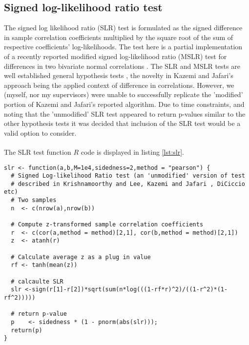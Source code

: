\subsection{Signed log-likelihood ratio test}
The signed log likelihood ratio (SLR) test is formulated as the signed difference in sample correlation coefficients multiplied by the square root of the sum of respective coefficients' log-likelihoods.  The test here is a partial implementation of a recently reported modified signed log-likelihood ratio (MSLR) test  for differences in two bivariate normal correlations \cite{Kazemi2016}. The SLR and MSLR tests are well established general hypothesis tests \cite{Barndorff1986,Barndorff1991,Diciccio2001,Krishnamoorthy2014}, the novelty in Kazemi and Jafari's approach being the applied context of difference in correlations. However, we (myself, nor my supervisors) were unable to successfully replicate the 'modified' portion of Kazemi and Jafari's reported algorithm.  Due to time constraints, and noting that the 'unmodified' SLR test appeared to return p-values similar to the other hypothesis tests it was decided that inclusion of the SLR test would be a valid option to consider.
\\
\\
The SLR test function $R$ code is displayed in listing \ref{lst:slr}.

\begin{lstlisting}[float=h,caption={Signed log-likelihood ratio test},label={lst:slr}]
slr <- function(a,b,M=1e4,sidedness=2,method = "pearson") {
  # Signed Log-likelihood Ratio test (an 'unmodified' version of test 
  # described in Krishnamoorthy and Lee, Kazemi and Jafari , DiCiccio etc)
  # Two samples
  n  <- c(nrow(a),nrow(b))
  
  # Compute z-transformed sample correlation coefficients
  r  <- c(cor(a,method = method)[2,1], cor(b,method = method)[2,1])
  z  <- atanh(r)
  
  # Calculate average z as a plug in value
  rf <- tanh(mean(z))
  
  # calcaulte SLR
  slr <-sign(r[1]-r[2])*sqrt(sum(n*log(((1-rf*r)^2)/((1-r^2)*(1-rf^2)))))
  
  # return p-value
  p    <- sidedness * (1 - pnorm(abs(slr))); 
  return(p)
}
\end{lstlisting}

